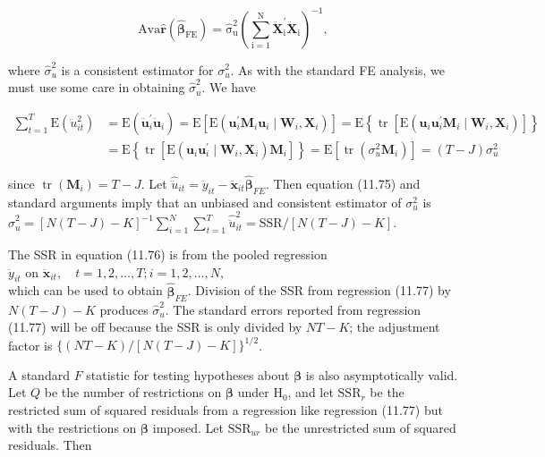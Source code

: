 \documentclass[10pt]{article}
\begin{document}
\begin{equation*}
\operatorname{Ava\hat {\mathbf {r}}(\hat {\boldsymbol {\beta }}_{FE})=\hat {\sigma }_{u}^{2}(\sum _{i=1}^{N}\ddot {\mathbf {X}}_{i}^{\prime }\ddot {\mathbf {X}}_{i})^{-1},} \tag{11.74}
\end{equation*}


where $\hat{\sigma}_{u}^{2}$ is a consistent estimator for $\sigma_{u}^{2}$. As with the standard FE analysis, we must use some care in obtaining $\hat{\sigma}_{u}^{2}$. We have


\begin{align*}
\sum_{t=1}^{T} \mathrm{E}\left(\ddot{u}_{i t}^{2}\right) & =\mathrm{E}\left(\ddot{\mathbf{u}}_{i}^{\prime} \ddot{\mathbf{u}}_{i}\right)=\mathrm{E}\left[\mathrm{E}\left(\mathbf{u}_{i}^{\prime} \mathbf{M}_{i} \mathbf{u}_{i} \mid \mathbf{W}_{i}, \mathbf{X}_{i}\right)\right]=\mathrm{E}\left\{\operatorname{tr}\left[\mathrm{E}\left(\mathbf{u}_{i} \mathbf{u}_{i}^{\prime} \mathbf{M}_{i} \mid \mathbf{W}_{i}, \mathbf{X}_{i}\right)\right]\right\} \\
& =\mathrm{E}\left\{\operatorname{tr}\left[\mathrm{E}\left(\mathbf{u}_{i} \mathbf{u}_{i}^{\prime} \mid \mathbf{W}_{i}, \mathbf{X}_{i}\right) \mathbf{M}_{i}\right]\right\}=\mathrm{E}\left[\operatorname{tr}\left(\sigma_{u}^{2} \mathbf{M}_{i}\right)\right]=(T-J) \sigma_{u}^{2} \tag{11.75}
\end{align*}


since $\operatorname{tr}\left(\mathbf{M}_{i}\right)=T-J$. Let $\hat{\ddot{u}}_{i t}=\ddot{y}_{i t}-\ddot{\mathbf{x}}_{i t} \hat{\boldsymbol{\beta}}_{F E}$. Then equation (11.75) and standard arguments imply that an unbiased and consistent estimator of $\sigma_{u}^{2}$ is\\
$\hat{\sigma}_{u}^{2}=[N(T-J)-K]^{-1} \sum_{i=1}^{N} \sum_{t=1}^{T} \hat{\ddot{u}}_{i t}^{2}=\mathrm{SSR} /[N(T-J)-K]$.

The SSR in equation (11.76) is from the pooled regression\\
$\ddot{y}_{i t}$ on $\ddot{\mathbf{x}}_{i t}, \quad t=1,2, \ldots, T ; i=1,2, \ldots, N$,\\
which can be used to obtain $\hat{\boldsymbol{\beta}}_{F E}$. Division of the SSR from regression (11.77) by $N(T-J)-K$ produces $\hat{\sigma}_{u}^{2}$. The standard errors reported from regression (11.77) will be off because the SSR is only divided by $N T-K$; the adjustment factor is $\{(N T-K) /[N(T-J)-K]\}^{1 / 2}$.

A standard $F$ statistic for testing hypotheses about $\boldsymbol{\beta}$ is also asymptotically valid. Let $Q$ be the number of restrictions on $\boldsymbol{\beta}$ under $\mathrm{H}_{0}$, and let $\mathrm{SSR}_{r}$ be the restricted sum of squared residuals from a regression like regression (11.77) but with the restrictions on $\boldsymbol{\beta}$ imposed. Let $\mathrm{SSR}_{u r}$ be the unrestricted sum of squared residuals. Then
\end{document}
